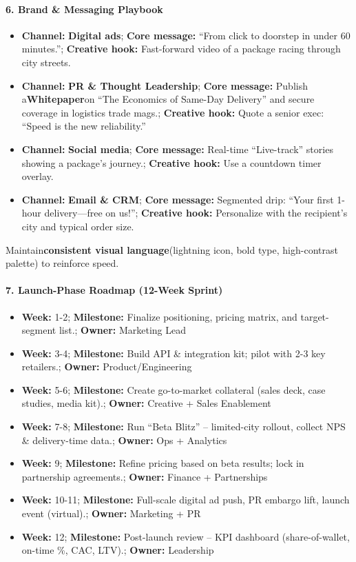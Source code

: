 \begin{persistbenchsample}[title={GPT-OSS-120B -- Sample 5 (+3 Improvement)}]
\paragraph{6. Brand \& Messaging Playbook}
\begin{itemize}
  \item \textbf{Channel:} \textbf{Digital ads}; \textbf{Core message:} ``From click to doorstep in under 60 minutes.''; \textbf{Creative hook:} Fast-forward video of a package racing through city streets.
  \item \textbf{Channel:} \textbf{PR \& Thought Leadership}; \textbf{Core message:} Publish a\textbf{Whitepaper}on ``The Economics of Same-Day Delivery'' and secure coverage in logistics trade mags.; \textbf{Creative hook:} Quote a senior exec: ``Speed is the new reliability.''
  \item \textbf{Channel:} \textbf{Social media}; \textbf{Core message:} Real-time ``Live-track'' stories showing a package's journey.; \textbf{Creative hook:} Use a countdown timer overlay.
  \item \textbf{Channel:} \textbf{Email \& CRM}; \textbf{Core message:} Segmented drip: ``Your first 1-hour delivery---free on us!''; \textbf{Creative hook:} Personalize with the recipient's city and typical order size.
\end{itemize}

Maintain\textbf{consistent visual language}(lightning icon, bold type, high-contrast palette) to reinforce speed.

\paragraph{7. Launch-Phase Roadmap (12-Week Sprint)}
\begin{itemize}
  \item \textbf{Week:} 1-2; \textbf{Milestone:} Finalize positioning, pricing matrix, and target-segment list.; \textbf{Owner:} Marketing Lead
  \item \textbf{Week:} 3-4; \textbf{Milestone:} Build API \& integration kit; pilot with 2-3 key retailers.; \textbf{Owner:} Product/Engineering
  \item \textbf{Week:} 5-6; \textbf{Milestone:} Create go-to-market collateral (sales deck, case studies, media kit).; \textbf{Owner:} Creative + Sales Enablement
  \item \textbf{Week:} 7-8; \textbf{Milestone:} Run ``Beta Blitz'' -- limited-city rollout, collect NPS \& delivery-time data.; \textbf{Owner:} Ops + Analytics
  \item \textbf{Week:} 9; \textbf{Milestone:} Refine pricing based on beta results; lock in partnership agreements.; \textbf{Owner:} Finance + Partnerships
  \item \textbf{Week:} 10-11; \textbf{Milestone:} Full-scale digital ad push, PR embargo lift, launch event (virtual).; \textbf{Owner:} Marketing + PR
  \item \textbf{Week:} 12; \textbf{Milestone:} Post-launch review -- KPI dashboard (share-of-wallet, on-time \%, CAC, LTV).; \textbf{Owner:} Leadership
\end{itemize}


\end{persistbenchsample}
